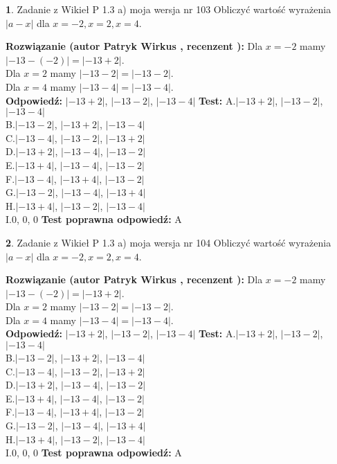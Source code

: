 \documentclass[12pt, a4paper]{article}
\theoremstyle{definition} %
\newtheorem{zad}{}
\newcommand{\zadStart}[1]{\begin{zad}#1\newline}
\newcommand{\zadStop}{\end{zad}}
\newcommand{\rozwStart}[2]{\noindent \textbf{Rozwiązanie (autor #1 , recenzent #2): }\newline}
\newcommand{\rozwStop}{\newline}
\newcommand{\odpStart}{\noindent \textbf{Odpowiedź:}\newline}
\newcommand{\odpStop}{\newline}
\newcommand{\testStart}{\noindent \textbf{Test:}\newline}
\newcommand{\testStop}{\newline}
\newcommand{\kluczStart}{\noindent \textbf{Test poprawna odpowiedź:}\newline}
\newcommand{\kluczStop}{\newline}
\begin{document}
\zadStart{Zadanie z Wikieł P 1.3 a) moja wersja nr 103}
Obliczyć wartość wyrażenia $|a - x|$ dla $x=-2,x=2,x=4$.
\zadStop
\rozwStart{Patryk Wirkus}{}
Dla $x = -2$ mamy $|-13 - (-2)| = |-13 + 2|$.\\
Dla $x = 2$ mamy $|-13 - 2| = |-13 - 2|$.\\
Dla $x = 4$ mamy $|-13 - 4| = |-13 - 4|$.\\
\rozwStop
\odpStart
$|-13 + 2|$, $|-13 - 2|$, $|-13 - 4|$
\odpStop
\testStart
A.$|-13 + 2|$, $|-13 - 2|$, $|-13 - 4|$\\
B.$|-13 - 2|$, $|-13 + 2|$, $|-13 - 4|$\\
C.$|-13 - 4|$, $|-13 - 2|$, $|-13 + 2|$\\
D.$|-13 + 2|$, $|-13 - 4|$, $|-13 - 2|$\\
E.$|-13 + 4|$, $|-13 - 4|$, $|-13 - 2|$\\
F.$|-13 - 4|$, $|-13 + 4|$, $|-13 - 2|$\\
G.$|-13 - 2|$, $|-13 - 4|$, $|-13 + 4|$\\
H.$|-13 + 4|$, $|-13 - 2|$, $|-13 - 4|$\\
I.$0$, $0$, $0$
\testStop
\kluczStart
A
\kluczStop



\zadStart{Zadanie z Wikieł P 1.3 a) moja wersja nr 104}
Obliczyć wartość wyrażenia $|a - x|$ dla $x=-2,x=2,x=4$.
\zadStop
\rozwStart{Patryk Wirkus}{}
Dla $x = -2$ mamy $|-13 - (-2)| = |-13 + 2|$.\\
Dla $x = 2$ mamy $|-13 - 2| = |-13 - 2|$.\\
Dla $x = 4$ mamy $|-13 - 4| = |-13 - 4|$.\\
\rozwStop
\odpStart
$|-13 + 2|$, $|-13 - 2|$, $|-13 - 4|$
\odpStop
\testStart
A.$|-13 + 2|$, $|-13 - 2|$, $|-13 - 4|$\\
B.$|-13 - 2|$, $|-13 + 2|$, $|-13 - 4|$\\
C.$|-13 - 4|$, $|-13 - 2|$, $|-13 + 2|$\\
D.$|-13 + 2|$, $|-13 - 4|$, $|-13 - 2|$\\
E.$|-13 + 4|$, $|-13 - 4|$, $|-13 - 2|$\\
F.$|-13 - 4|$, $|-13 + 4|$, $|-13 - 2|$\\
G.$|-13 - 2|$, $|-13 - 4|$, $|-13 + 4|$\\
H.$|-13 + 4|$, $|-13 - 2|$, $|-13 - 4|$\\
I.$0$, $0$, $0$
\testStop
\kluczStart
A
\kluczStop
\end{document}
